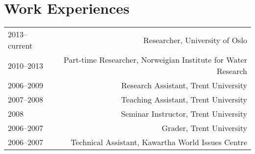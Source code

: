 \section*{Work Experiences}
\begin{tabular}{L!{\VRule}R}  
2013--current & Researcher, University of Oslo \\
2010--2013 & Part-time Researcher, Norweigian Institute for Water Research  \\
2006--2009 & Research Assistant, Trent University \\
2007--2008 & Teaching Assistant, Trent University \\
2008 & Seminar Instructor, Trent University \\
2006--2007 & Grader, Trent University \\
2006--2007 & Technical Assistant, Kawartha World Issues Centre \\
\end{tabular}
